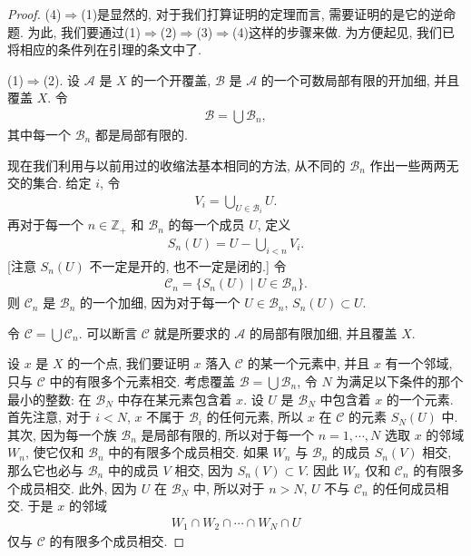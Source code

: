 \documentclass[../../main.tex]{subfiles}
\begin{document}
\begin{proof}
(4)$\Rightarrow$(1)是显然的, 对于我们打算证明的定理而言, 需要证明的是它的逆命题. 为此, 我们要通过(1)$\Rightarrow$(2)$\Rightarrow$(3)$\Rightarrow$(4)这样的步骤来做. 为方便起见, 我们已将相应的条件列在引理的条文中了.

(1)$\Rightarrow$(2). 设 $\mathcal{A}$ 是 $X$ 的一个开覆盖, $\mathcal{B}$ 是 $\mathcal{A}$ 的一个可数局部有限的开加细, 并且覆盖 $X$. 令
\begin{align*}
\mathcal{B}=\bigcup\mathcal{B}_n,
\end{align*}
其中每一个 $\mathcal{B}_n$ 都是局部有限的.

现在我们利用与以前用过的收缩法基本相同的方法, 从不同的 $\mathcal{B}_n$ 作出一些两两无交的集合. 给定 $i$, 令
\begin{align*}
V_i=\bigcup_{U\in\mathcal{B}_i}U.
\end{align*}
再对于每一个 $n\in\mathbb{Z}_+$ 和 $\mathcal{B}_n$ 的每一个成员 $U$, 定义
\begin{align*}
S_n(U)=U-\bigcup_{i<n}V_i.
\end{align*}
[注意 $S_n(U)$ 不一定是开的, 也不一定是闭的.] 令
\begin{align*}
\mathcal{C}_n=\{S_n(U)\mid U\in\mathcal{B}_n\}.
\end{align*}
则 $\mathcal{C}_n$ 是 $\mathcal{B}_n$ 的一个加细, 因为对于每一个 $U\in\mathcal{B}_n$, $S_n(U)\subset U$.

令 $\mathcal{C}=\bigcup\mathcal{C}_n$. 可以断言 $\mathcal{C}$ 就是所要求的 $\mathcal{A}$ 的局部有限加细, 并且覆盖 $X$.

设 $x$ 是 $X$ 的一个点, 我们要证明 $x$ 落入 $\mathcal{C}$ 的某一个元素中, 并且 $x$ 有一个邻域, 只与 $\mathcal{C}$ 中的有限多个元素相交. 考虑覆盖 $\mathcal{B}=\bigcup\mathcal{B}_n$, 令 $N$ 为满足以下条件的那个最小的整数: 在 $\mathcal{B}_N$ 中存在某元素包含着 $x$. 设 $U$ 是 $\mathcal{B}_N$ 中包含着 $x$ 的一个元素. 首先注意, 对于 $i<N$, $x$ 不属于 $\mathcal{B}_i$ 的任何元素, 所以 $x$ 在 $\mathcal{C}$ 的元素 $S_N(U)$ 中. 其次, 因为每一个族 $\mathcal{B}_n$ 是局部有限的, 所以对于每一个 $n=1,\cdots,N$ 选取 $x$ 的邻域 $W_n$, 使它仅和 $\mathcal{B}_n$ 中的有限多个成员相交. 如果 $W_n$ 与 $\mathcal{B}_n$ 的成员 $S_n(V)$ 相交, 那么它也必与 $\mathcal{B}_n$ 中的成员 $V$ 相交, 因为 $S_n(V)\subset V$. 因此 $W_n$ 仅和 $\mathcal{C}_n$ 的有限多个成员相交. 此外, 因为 $U$ 在 $\mathcal{B}_N$ 中, 所以对于 $n>N$, $U$ 不与 $\mathcal{C}_n$ 的任何成员相交. 于是 $x$ 的邻域
\begin{align*}
W_1\cap W_2\cap\cdots\cap W_N\cap U
\end{align*}
仅与 $\mathcal{C}$ 的有限多个成员相交.


\end{proof}
\end{document}
